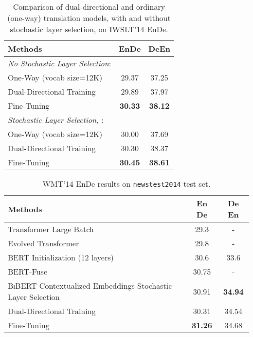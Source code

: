 \documentclass[11pt]{article}
\begin{document}
\begin{table}[ht]
\begin{small}
\centering
\begin{tabular}{lcc}
\hline
Methods  & EnDe & DeEn \\ 
\hline
\textit{No Stochastic Layer Selection}:  &    &    \\ 
\hline
\multicolumn{1}{l|}{One-Way (vocab size=12K)} & \multicolumn{1}{c}{29.37}   & 37.25 \\
\multicolumn{1}{l|}{Dual-Directional Training} & 29.89 & 37.97 \\
\multicolumn{1}{l|}{\quad  Fine-Tuning} & \multicolumn{1}{c}{\textbf{30.33}} & \textbf{\textbf{38.12}} \\

\hline
\textit{Stochastic Layer Selection, }:  &    &    \\ 
\hline
\multicolumn{1}{l|}{One-Way (vocab size=12K)} & \multicolumn{1}{c}{30.00}   & 37.69 \\
\multicolumn{1}{l|}{Dual-Directional Training} & 30.30 & 38.37 \\
\multicolumn{1}{l|}{\quad  Fine-Tuning } & \multicolumn{1}{c}{\textbf{30.45}} & \textbf{\textbf{38.61}} \\
\hline

\end{tabular}
\caption{Comparison of dual-directional and ordinary (one-way) translation models, with and without stochastic layer selection, on IWSLT'14 EnDe. }
\label{tab:iwslt14-bi}
\end{small}
\end{table}

\begin{table*}[ht]
\begin{small}
\centering
\begin{tabular}{lcc}

\hline
Methods & En  De & De  En \\
\hline
Transformer  Large Batch  \citep{ott-etal-2018-scaling}  & 29.3 & - \\
Evolved Transformer  \citep{so2019evolved} & 29.8 & - \\
\textsc{BERT} Initialization (12 layers) \citep{rothe-etal-2020-leveraging} & 30.6 &  33.6 \\
\textsc{BERT}-Fuse \citep{Zhu2020Incorporating} & 30.75 & - \\

\hline
\textsc{BiBERT} Contextualized Embeddings  Stochastic Layer Selection & 30.91 & \bf 34.94 \\
\quad  Dual-Directional Training & 30.31 & 34.54 \\
\quad  Fine-Tuning & \bf 31.26 & 34.68 \\
\hline

\end{tabular}
\caption{WMT'14 EnDe results on \texttt{newstest2014} test set.}
\label{tab:wmt}
\end{small}
\end{table*}
\end{document}
